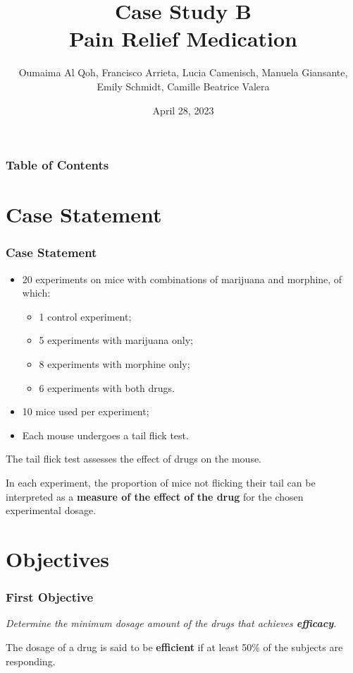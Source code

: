 \documentclass[14pt]{beamer}
\author{Oumaima Al Qoh, Francisco Arrieta, Lucia Camenisch, Manuela Giansante, Emily Schmidt, Camille Beatrice Valera}
\title{Case Study B \\ Pain Relief Medication}
\date{April 28, 2023}
\begin{document}
\begin{frame}
\titlepage
\end{frame}



\begin{frame}
\frametitle{Table of Contents}
\tableofcontents
\end{frame}


\section{Case Statement}
\begin{frame}
\frametitle{Case Statement}
\begin{itemize}[label={$\blacktriangleright$}]
\item 20 experiments on mice with combinations of marijuana and morphine, of which:
\begin{itemize}[label={$\blacktriangleright$}]
\item 1 control experiment;
\item 5 experiments with marijuana only;
\item 8 experiments with morphine only;
\item 6 experiments with both drugs.
\end{itemize}
\item 10 mice used per experiment;
\item Each mouse undergoes a tail flick test.
\end{itemize}
\end{frame}

\begin{frame}
The tail flick test assesses the effect of drugs on the mouse.

\bigskip

In each experiment, the proportion of mice not flicking their tail can be interpreted as a \textbf{measure of the effect of the drug} for the chosen experimental dosage.
\end{frame}

\section{Objectives}
\begin{frame}
\frametitle{First Objective}
\textit{Determine the minimum dosage amount of the drugs that achieves \textbf{efficacy}.}

\bigskip

The dosage of a drug is said to be \textbf{efficient} if at least 50\% of the subjects are responding.
\end{frame}
\end{document}
